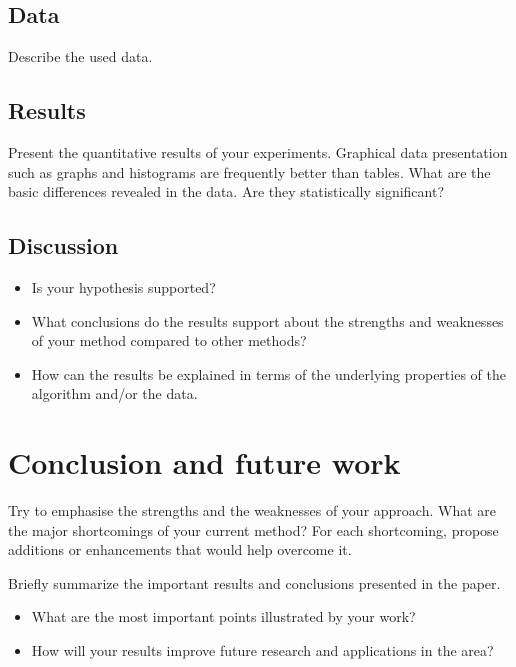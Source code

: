 \documentclass[runningheads,a4paper,11pt]{report}
\begin{document}
\section{Data}
\label{section:data}

Describe the used data.

\section{Results}
\label{section:results}

Present the quantitative results of your experiments. Graphical data presentation such as graphs and histograms are frequently better than tables. What are the basic differences revealed in the data. Are they statistically significant?

\section{Discussion}
\label{section:discussion}

\begin{itemize}
	\item Is your hypothesis supported? 
	\item What conclusions do the results support about the strengths and weaknesses of your method compared to other methods? 
	\item How can the results be explained in terms of the underlying properties of the algorithm and/or the data. 
\end{itemize}



\chapter{Conclusion and future work}
\label{chapter:concl}

Try to emphasise the strengths and the weaknesses of your approach.
What are the major shortcomings of your current method? For each shortcoming, propose additions or enhancements that would help overcome it. 

Briefly summarize the important results and conclusions presented in the paper. 

\begin{itemize}
	\item What are the most important points illustrated by your work? 
	\item How will your results improve future research and applications in the area? 
\end{itemize}




\end{document}
